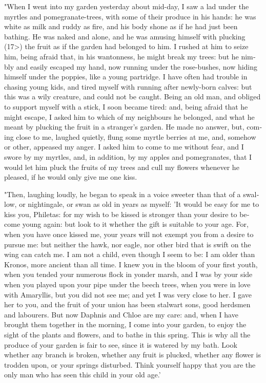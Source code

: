 \documentclass{book}
\begin{document}
\begin{pairs}
\begin{Rightside}
\begin{english}
  "When I went into my garden yesterday about mid-day, I saw a lad under the myrtles and pomegranate-trees, with some of their produce in his hands: he was white as milk and ruddy as fire, and his body shone as if he had just been bathing.  He was naked and alone, and he was amusing himself with plucking (17>) the fruit as if the garden had belonged to him.  I rushed at him to seize him, being afraid that, in his wantonness, he might break my trees: but he nimbly and easily escaped my hand, now running under the rose-bushes, now hiding himself under the poppies, like a young partridge.  I have often had trouble in chasing young kids, and tired myself with running after newly-born calves: but this was a wily creature, and could not be caught.  Being an old man, and obliged to support myself with a stick, I soon became tired: and, being afraid that he might escape, I asked him to which of my neighbours he belonged, and what he meant by plucking the fruit in a stranger's garden.  He made no answer, but, coming close to me, laughed quietly, flung some myrtle berries at me, and, somehow or other, appeased my anger.  I asked him to come to me without fear, and I swore by my myrtles, and, in addition, by my apples and pomegranates, that I would let him pluck the fruits of my trees and cull my flowers whenever he pleased, if he would only give me one kiss.
\pend


  "Then, laughing loudly, he began to speak in a voice sweeter than that of a swallow, or nightingale, or swan as old in years as myself: 'It would be easy for me to kiss you, Philetas: for my wish to be kissed is stronger than your desire to become young again: but look to it whether the gift is suitable to your age.  For, when you have once kissed me, your years will not exempt you from a desire to pursue me: but neither the hawk, nor eagle, nor other bird that is swift on the wing can catch me.  I am not a child, even though I seem to be: I am older than Kronos, more ancient than all time.  I knew you in the bloom of your first youth, when you tended your numerous flock in yonder marsh, and I was by your side when you played upon your pipe under the beech trees, when you were in love with Amaryllis, but you did not see me; and yet I was very close to her.  I gave her to you, and the fruit of your union has been stalwart sons, good herdsmen and labourers.  But now Daphnis and Chloe are my care: and, when I have brought them together in the morning, I come into your garden, to enjoy the sight of the plants and flowers, and to bathe in this spring.  This is why all the produce of your garden is fair to see, since it is watered by my bath.  Look whether any branch is broken, whether any fruit is plucked, whether any flower is trodden upon, or your springs disturbed.  Think yourself happy that you are the only man who has seen this child in your old age.'
\pend



\end{english}
\end{Rightside}
\end{pairs}
\end{document}
